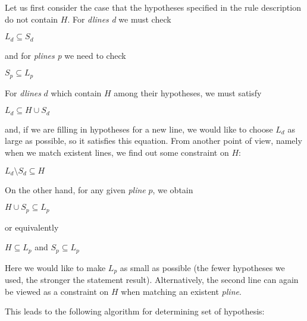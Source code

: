 Let us first consider the case that the hypotheses specified in the rule
description do not contain $H$.  For {\it dlines} {\it d} we must check

$L_d\subseteq S_d$

and for {\it plines} {\it p} we need to check

$S_p \subseteq L_p$

For {\it dlines} $d$ which contain $H$ among their hypotheses,
we must satisfy

$L_d \subseteq H \cup S_d$

and, if we are filling in hypotheses for a new line, we would like to choose
$L_d$ as large as possible, so it satisfies this equation.  From another point
of view, namely when we match existent lines, we find out some constraint on
$H$:

$L_d \setminus S_d \subseteq H$

On the other hand, for any given {\it pline} $p$, we obtain

$H \cup S_p \subseteq L_p$ 

or equivalently 

$H \subseteq L_p$ and $S_p \subseteq L_p$

Here we would like to make $L_p$ as small as possible (the fewer hypotheses
we used, the stronger the statement result).  Alternatively, the second line
can again be viewed as a constraint on $H$ when matching an existent
{\it pline}.

This leads to the following algorithm for determining set of hypothesis:


